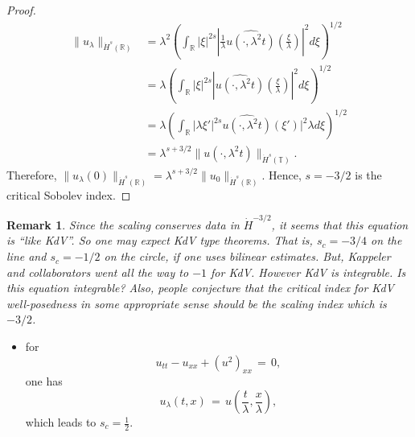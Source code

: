 \documentclass[12pt,reqno]{amsart}
\numberwithin{equation}{section}  %
\newcommand{\rr}{\mathbb{R}}
\newcommand{\ci}{\mathbb{T}}
\newcommand{\wh}{\widehat}
\newtheorem{remark}[theorem]{Remark}
\begin{document}
\begin{proof}
%
%
\begin{equation*}
\begin{split}
  \| u_{\lambda} \|_{\dot{H}^s(\rr)} 
  & = \lambda^{2} \left( \int_{\rr} | \xi |^{2s} |
  \frac{1}{\lambda}\wh{u(\cdot, \lambda^{2}t)}(\frac{\xi}{\lambda}) |^2 d \xi
  \right)^{1/2}
  \\
  & = \lambda \left( \int_{\rr}| \xi |^{2s} | \wh{u(\cdot,
  \lambda^{2}t)}(\frac{\xi}{\lambda}) |^2 d \xi  \right)^{1/2}
  \\
  & = \lambda \left( \int_{\rr} | \lambda \xi' |^{2s} 
  \wh{u(\cdot, \lambda^{2}t)}(\xi') |^2 \lambda d \xi
  \right)^{1/2}
  \\
  & = \lambda^{s + 3/2} \|u(\cdot, \lambda^{2}t) \|_{\dot{H}^s (\ci)}.
\end{split}
\end{equation*}
%
%
Therefore, $\| u_{\lambda}(0) \|_{\dot{H}^s(\rr)} = \lambda^{s + 3/2} \|
u_{0} \|_{\dot{H}^{s}(\rr)}$. Hence, $s=-3/2$ is the critical Sobolev index.
\end{proof}
%
%
\begin{framed}
\begin{remark}
Since the scaling conserves data in $\dot{H}^{-3/2}$, it
seems that this equation is ``like KdV''.
So one may expect KdV type theorems.
That is, $s_c=-3/4$ on the line and $s_c=-1/2$ on the circle,
if one uses bilinear estimates.
But, Kappeler and collaborators went all the way to $-1$ for KdV.
However KdV is integrable. Is this equation integrable?
Also, people conjecture that the critical index for KdV well-posedness 
in some appropriate sense should be the scaling index which is  $-3/2$.
\label{rem:kdv-like}
\end{remark}
\end{framed}
%
%
\begin{itemize}
  \item for 
    \[
    u_{tt}-u_{xx}+(u^2)_{xx}\,=\,0,
    \]
    one has 
    \[
    u_{\lambda}(t,x)\,=\,u\left(\frac{t}{\lambda}, \frac{x}{\lambda}\right),
    \]
    which leads to $s_c=\frac 12$.
\end{itemize}
\end{document}
